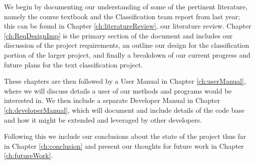 We begin by documenting our understanding of some of the pertinent literature, namely the course textbook and the Classification team report from last year; this can be found in Chapter \ref{ch:literatureReview}, our literature review. Chapter \ref{ch:ReqDesignImp} is the primary section of the document and includes our discussion of the project requirements, an outline our design for the classification portion of the larger project, and finally a breakdown of our current progress and future plans for the text classification project.

These chapters are then followed by a User Manual in Chapter \ref{ch:userManual}, where we will discuss details a user of our methods and programs would be interested in. We then include a separate Developer Manual in Chapter \ref{ch:developerManual}, which will document and include details of the code base and how it might be extended and leveraged by other developers.

Following this we include our conclusions about the state of the project thus far in Chapter \ref{ch:conclusion} and present our thoughts for future work in Chapter \ref{ch:futureWork}.
